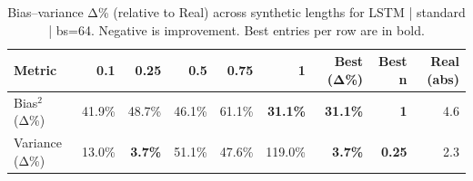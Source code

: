 \renewcommand{\arraystretch}{1.2}
\begin{table}[!t]
\centering
\footnotesize
\caption{Bias–variance Δ\% (relative to Real) across synthetic lengths for LSTM | standard | bs=64. Negative is improvement. Best entries per row are in bold.}
\label{tab:bvdelta_LSTM_standard_bs64}
\setlength{\tabcolsep}{5pt}
\begin{tabular}{lrrrrrrrr}
\toprule
Metric & 0.1 & 0.25 & 0.5 & 0.75 & 1 & Best (Δ\%) & Best n & Real (abs) \\
\midrule
Bias$^2$ (Δ\%) & 41.9\% & 48.7\% & 46.1\% & 61.1\% & \textbf{31.1\%} & \textbf{31.1\%} & \textbf{1} & 4.6 \\
Variance (Δ\%) & 13.0\% & \textbf{3.7\%} & 51.1\% & 47.6\% & 119.0\% & \textbf{3.7\%} & \textbf{0.25} & 2.3 \\
\bottomrule
\end{tabular}

\end{table}
